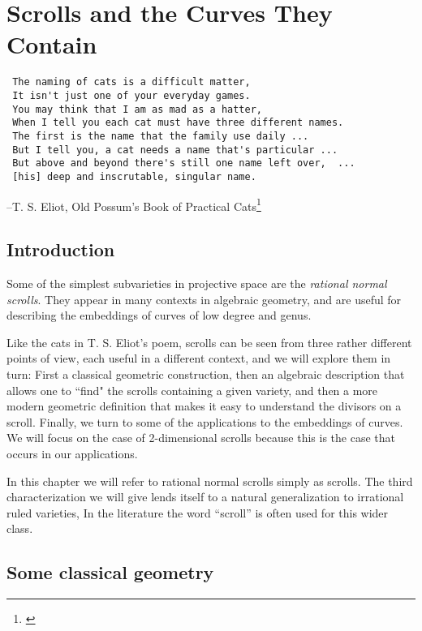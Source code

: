 

\chapter{Scrolls and the Curves They Contain}
\label{ScrollsChapter}


\begin{verbatim}
 The naming of cats is a difficult matter,
 It isn't just one of your everyday games.
 You may think that I am as mad as a hatter,
 When I tell you each cat must have three different names.
 The first is the name that the family use daily ...
 But I tell you, a cat needs a name that's particular ...
 But above and beyond there's still one name left over,  ...
 [his] deep and inscrutable, singular name.
\end{verbatim}
--T. S. Eliot, Old Possum's Book of Practical Cats\footnote{\cite{PracticalCats}}


\section*{Introduction}
Some of the simplest subvarieties in projective space are the \emph{rational normal scrolls}. They appear in many contexts in algebraic geometry, and are useful for describing the embeddings of curves of low degree and genus. 

Like the cats in T. S. Eliot's poem, scrolls can be seen from three rather different points of view, each useful in a different context, and we will explore them in turn: First a classical geometric construction, then an algebraic description that allows one to ``find" the scrolls containing a given variety, and then a more modern geometric definition that makes it easy to understand the divisors on a scroll. Finally, we turn to some of the applications to the embeddings of curves. We will focus on the case of 2-dimensional scrolls because this is the case that occurs in our applications.

In this chapter we will refer to rational normal scrolls simply as scrolls. The third characterization we will give lends itself to a natural generalization to  irrational ruled varieties, In the literature the word ``scroll'' is often used for this wider class.

\section{Some classical geometry}\label{daily name}

